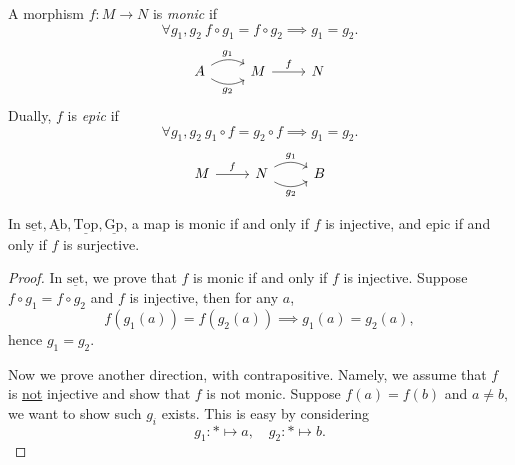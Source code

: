 \begin{definition}
	A morphism \(f\colon M\to N\) is \emph{monic} if
	\[
		\forall g_1, g_2\ f\circ g_1 = f\circ g_2 \implies g_1 = g_2.
	\]
	\[
		\begin{tikzcd}
			A\ar[r, bend left, "g_1"]\ar[r, bend right, "g_2"']& M \ar[r, "f"]& N
		\end{tikzcd}
	\]
	Dually, \(f\) is \emph{epic} if
	\[
		\forall g_1, g_2\ g_{1} \circ f = g_2 \circ f \implies g_1 = g_2.
	\]
	\[
		\begin{tikzcd}
			M\ar[r, "f"]& N\ar[r, bend left, "g_1"]\ar[r, bend right, "g_2"']& B
		\end{tikzcd}
	\]
\end{definition}

\begin{lemma}
	In \(\underline{\mathrm{set}}, \underline{\mathrm{Ab}}, \underline{\mathrm{Top}}, \underline{\mathrm{Gp}}\), a map is monic if and only
	if \(f\) is injective, and epic if and only if \(f\) is surjective.
\end{lemma}
\begin{proof}
	In \(\underline{\mathrm{set}}\), we prove that \(f\) is monic if and only if \(f\) is injective. Suppose
	\(f\circ g_1 = f\circ g_2\) and \(f\) is injective, then for any \(a\),
	\[
		f(g_1(a)) = f(g_2(a))\implies g_1(a) = g_2(a),
	\]
	hence \(g_1 = g_2\).

	\par Now we prove another direction, with contrapositive. Namely, we assume that \(f\) is \underline{not} injective and show that
	\(f\) is not monic. Suppose \(f(a) = f(b)\) and \(a\neq b\), we want to show such \(g_{i}\) exists. This is easy by considering
	\[
		g_1\colon *\mapsto a,\quad g_2\colon *\mapsto b.
	\]
\end{proof}

